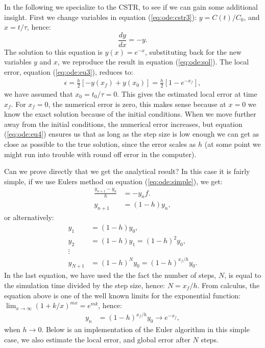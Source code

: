 \documentclass[graybox,sectrefs,envcountresetchap,open=right,final]{svmonodo}
\begin{document}
In the following we specialize to the CSTR, to see if we can gain some additional insight. First we change variables in 
equation (\ref{eq:ode:cstr3}): $y=C(t)/C_0$, and $x=t/\tau$, hence:
\begin{equation}
\frac{dy}{dx}=-y.\label{eq:ode:simple}
\end{equation}
The solution to this equation is $y(x)=e^{-x}$, substituting back for the new variables $y$ and $x$, we reproduce the result in equation (\ref{eq:ode:sol}). 
The local error, equation (\ref{eq:ode:eu3}), reduces to:
\begin{align}
\epsilon=\frac{h}{2}\left[-y(x_f)+y(x_0)\right]=\frac{h}{2}\left[1-e^{-x_f}\right],\label{eq:ode:eu4}
\end{align}
we have assumed that $x_0=t_0/\tau=0$. This gives the estimated local error at time $x_f$. For $x_f=0$, the 
numerical error is zero, this makes sense because at $x=0$ we know the exact solution because of the initial conditions. When we move further away from the initial conditions, the
numerical error increases, but equation (\ref{eq:ode:eu4}) ensures us that as long as the step size is low enough we can get as
close as possible to the true solution, since the error scales as $h$ (at some point we might run into trouble with round off error in the computer).

Can we prove directly that we get the analytical result? In this 
case it is fairly simple, if we use Eulers method on equation (\ref{eq:ode:simple}), we get:
\begin{align}
\frac{y_{n+1}-y_n}{h}&=-y_nf.\nonumber\\ 
y_{n+1}&=(1-h)y_n,
\end{align}
or alternatively:
\begin{align}
y_1&=(1-h)y_0,\nonumber\\ 
y_2&=(1-h)y_1=(1-h)^2y_0,\nonumber\\ 
\vdots\nonumber\\ 
y_{N+1}&=(1-h)^{N}y_0=(1-h)^{x_f/h}y_0.
\end{align}
In the last equation, we have used the the fact the number of steps, $N$, is equal to the simulation time divided by the step size, hence: $N=x_f/h$. From calculus,
the equation above is one of the well known limits for the exponential function: $\lim_{x\to\infty}(1+k/x)^{mx}=e^{mk}$, hence:
\begin{align}
y_n&=(1-h)^{x_f/h}y_0\to e^{-x_f},
\end{align}
when $h\to0$. Below is an implementation of the Euler algorithm in this simple case, we also estimate the local error, and global error after $N$ steps. 
\end{document}
